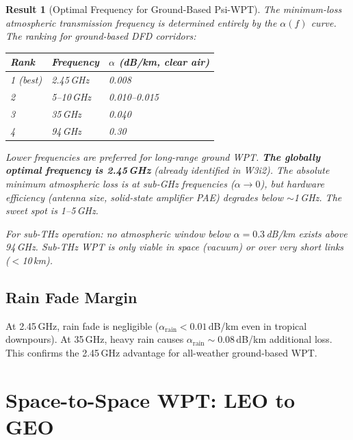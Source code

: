 \documentclass[aps,prd,twocolumn,superscriptaddress]{revtex4-2}
\newtheorem{result}{Result}
\begin{document}
\begin{result}[Optimal Frequency for Ground-Based Psi-WPT]
The minimum-loss atmospheric transmission frequency is determined entirely
by the $\alpha(f)$ curve.  The ranking for ground-based DFD corridors:

\begin{table}[h]
\begin{ruledtabular}
\begin{tabular}{lll}
Rank & Frequency & $\alpha$ (dB/km, clear air) \\
\hline
1 (best) & 2.45\,GHz & 0.008 \\
2 & 5--10\,GHz & 0.010--0.015 \\
3 & 35\,GHz & 0.040 \\
4 & 94\,GHz & 0.30 \\
\end{tabular}
\end{ruledtabular}
\end{table}

Lower frequencies are preferred for long-range ground WPT.
\textbf{The globally optimal frequency is 2.45\,GHz}
(already identified in W3i2).  The absolute minimum atmospheric
loss is at sub-GHz frequencies ($\alpha \to 0$), but hardware
efficiency (antenna size, solid-state amplifier PAE) degrades below
$\sim$1\,GHz.  The sweet spot is 1--5\,GHz.

For sub-THz operation: no atmospheric window below $\alpha = 0.3$\,dB/km
exists above 94\,GHz.  Sub-THz WPT is only viable in space (vacuum)
or over very short links ($<$10\,km).
\end{result}

\subsection{Rain Fade Margin}

At 2.45\,GHz, rain fade is negligible ($\alpha_\mathrm{rain} < 0.01$\,dB/km
even in tropical downpours).  At 35\,GHz, heavy rain causes
$\alpha_\mathrm{rain} \sim 0.08$\,dB/km additional loss.  This confirms
the 2.45\,GHz advantage for all-weather ground-based WPT.

\section{Space-to-Space WPT: LEO to GEO}
\label{sec:space_wpt}
\end{document}
